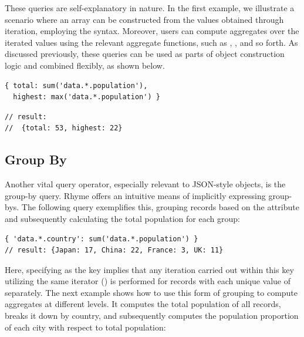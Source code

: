 \documentclass[runningheads]{llncs}
\newcommand{\lang}{Rhyme}
\begin{document}
These queries are self-explanatory in nature.
In the first example, we illustrate a scenario where an array can be constructed
from the values obtained through iteration, employing the \inline{[...]} syntax.
Moreover, users can compute aggregates over the iterated values using the
relevant aggregate functions, such as , , and so forth.
As discussed previously, these queries can be used as parts of object
construction logic and combined flexibly, as shown below.

\hspace{-18pt}
\begin{minipage}{0.5\textwidth}
\begin{lstlisting}[style=JavaScript, columns=flexible, numbers=none]
{ total: sum('data.*.population'), 
  highest: max('data.*.population') }
\end{lstlisting}
\end{minipage}%
\begin{minipage}{0.5\textwidth}
\begin{lstlisting}[style=JavaScript, columns=flexible, numbers=none]
// result: 
//  {total: 53, highest: 22}
\end{lstlisting}
\end{minipage}

\vspace{-3mm}
\subsection{Group By}\label{subsec:groupby}
\vspace{-2mm}
Another vital query operator, especially relevant to JSON-style objects,
is the group-by query.
\lang{} offers an intuitive means of implicitly expressing group-bys.
The following query exemplifies this, grouping records based on the
 attribute and subsequently calculating the total population
for each group:

\begin{lstlisting}[style=JavaScript, columns=flexible, numbers=none]
{ 'data.*.country': sum('data.*.population') }
// result: {Japan: 17, China: 22, France: 3, UK: 11}
\end{lstlisting}

Here, specifying  as the key implies
that any iteration carried out within this key utilizing the same
iterator (\inline{*}) is performed for records with each unique value of 
separately.
The next example shows how to use this form of grouping to compute aggregates at different
levels.
It computes the total population of all records, breaks it down by country,
and subsequently computes the population proportion of each city with respect to total
population:
\end{document}
